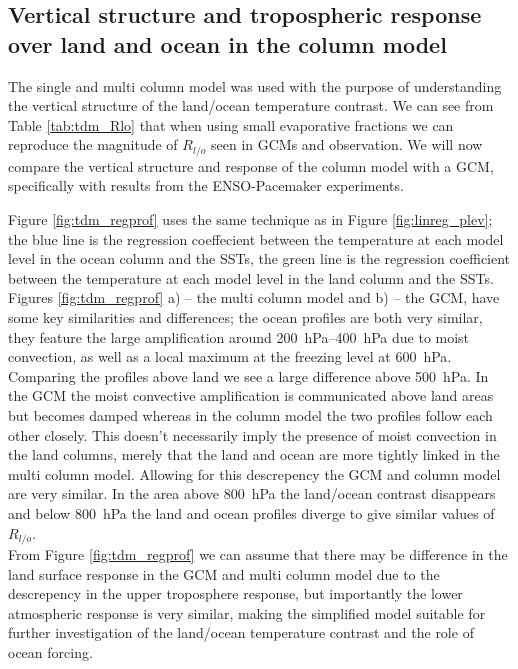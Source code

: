 \subsection{Vertical structure and tropospheric response over land and ocean in 
the column model}

The single and multi column model was used with the purpose of understanding the 
vertical structure of the land/ocean temperature contrast. We can see from Table 
\ref{tab:tdm_Rlo} that when using small evaporative fractions we can reproduce 
the magnitude of $R_{l/o}$ seen in GCMs and observation. We will now compare the 
vertical structure and response of the column model with a GCM, specifically 
with results from the ENSO-Pacemaker experiments.  

Figure \ref{fig:tdm_regprof} uses the same technique as in Figure 
\ref{fig:linreg_plev}; the blue line is the regression coeffecient between the 
temperature at each model level in the ocean column and the SSTs, the green line 
is the regression coefficient between the temperature at each model level in the 
land column and the SSTs. Figures \ref{fig:tdm_regprof} a) -- the multi column 
model and b) -- the GCM, have some key similarities and differences; the ocean 
profiles are both very similar, they feature the large amplification around 
\SIrange{200}{400}{\hecto\pascal} due to moist convection, as well as a local 
maximum at the freezing level at \SI{600}{\hecto\pascal}.  Comparing the 
profiles above land we see a large difference above \SI{500}{\hecto\pascal}. In 
the GCM the moist convective amplification is communicated above land areas but 
becomes damped whereas in the column model the two profiles follow each other 
closely.  This doesn't necessarily imply the presence of moist convection in the 
land columns, merely that the land and ocean are more tightly linked in the 
multi column model.  Allowing for this descrepency the GCM and column model are 
very similar.  In the area above \SI{800}{\hecto\pascal} the land/ocean contrast 
disappears and below \SI{800}{\hecto\pascal} the land and ocean profiles diverge 
to give similar values of $R_{l/o}$.\\
From Figure \ref{fig:tdm_regprof} we can assume that there may be difference in 
the land surface response in the GCM and multi column model due to the 
descrepency in the upper troposphere response, but importantly the lower 
atmospheric response is very similar, making the simplified model suitable for 
further investigation of the land/ocean temperature contrast and the role of 
ocean forcing.


